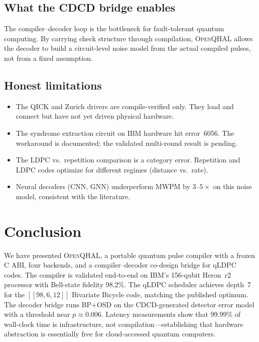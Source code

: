 \documentclass[aps,prApplied,twocolumn,superscriptaddress,floatfix]{revtex4-2}
\begin{document}
\subsection{What the CDCD bridge enables}

The compiler--decoder loop is the bottleneck for fault-tolerant quantum
computing. By carrying check structure through compilation,
\textsc{OpenQHAL} allows the decoder to build a circuit-level noise
model from the actual compiled pulses, not from a fixed assumption.

\subsection{Honest limitations}

\begin{itemize}
  \item The QICK and Zurich drivers are compile-verified only. They load
        and connect but have not yet driven physical hardware.
  \item The syndrome extraction circuit on IBM hardware hit error~6056.
        The workaround is documented; the validated multi-round result
        is pending.
  \item The LDPC vs.\ repetition comparison is a category error.
        Repetition and LDPC codes optimize for different regimes
        (distance vs.\ rate).
  \item Neural decoders (CNN, GNN) underperform MWPM by $3$--$5\times$
        on this noise model, consistent with the literature.
\end{itemize}

\section{Conclusion}
\label{sec:conclusion}

We have presented \textsc{OpenQHAL}, a portable quantum pulse compiler
with a frozen C ABI, four backends, and a compiler--decoder co-design
bridge for qLDPC codes. The compiler is validated end-to-end on IBM's
156-qubit Heron~r2 processor with Bell-state fidelity \num{98.2}\%. The
qLDPC scheduler achieves depth~7 for the $[[98,6,12]]$ Bivariate Bicycle
code, matching the published optimum. The decoder bridge runs BP+OSD on
the CDCD-generated detector error model with a threshold near
$p \approx \num{0.006}$. Latency measurements show that \num{99.99}\%
of wall-clock time is infrastructure, not compilation---establishing
that hardware abstraction is essentially free for cloud-accessed quantum
computers.
\end{document}
